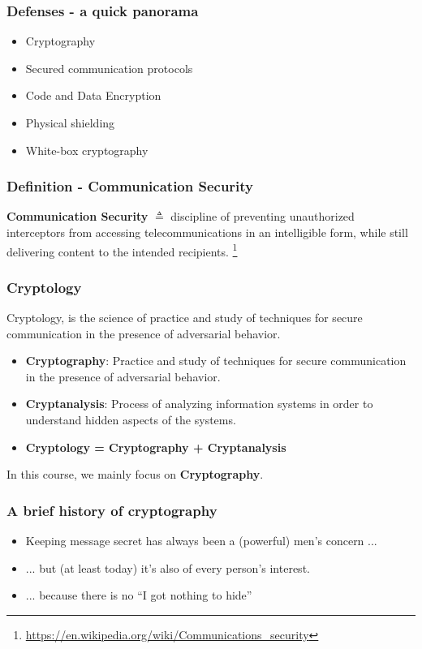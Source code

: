 \documentclass[
hyperref={pdfpagelabels=false}
,xcolor=table
]
{beamer}
\begin{document}
\begin{frame}
  \frametitle{Defenses - a quick panorama}
  \begin{itemize}
  \item Cryptography
  \item Secured communication protocols
  \item Code and Data Encryption
  \item Physical shielding
  \item White-box cryptography    
  \end{itemize}
\end{frame}


\begin{frame}[fragile]
  \frametitle{Definition - Communication Security}

  \begin{block}{}
    \textbf{Communication Security} $\triangleq$
    discipline of preventing unauthorized interceptors
    from accessing telecommunications in an intelligible form, while
    still delivering content to the intended
    recipients. \footnote{\url{https://en.wikipedia.org/wiki/Communications_security}}
  \end{block}
\end{frame}


\begin{frame}
  \frametitle{Cryptology}

  Cryptology, is the science of practice and study of techniques for secure communication in the presence of adversarial behavior.

  \begin{itemize}
  \item \textbf{Cryptography}: Practice and study of techniques for secure communication in the presence of adversarial behavior.
  \item \textbf{Cryptanalysis}: Process of analyzing information systems in order to understand hidden aspects of the systems. 
  \item \textbf{Cryptology = Cryptography + Cryptanalysis}
  \end{itemize}

  In this course, we mainly focus on \textbf{Cryptography}. 
\end{frame}


\begin{frame}
  \frametitle{A brief history of cryptography}

  \begin{itemize}
  \item Keeping message secret has always been a (powerful) men's
    concern ...
  \item  ... but (at least today) it's also of every person's interest. 
  \item ... because there is no ``I got nothing to hide'' 
  \end{itemize}
\end{frame}
\end{document}

